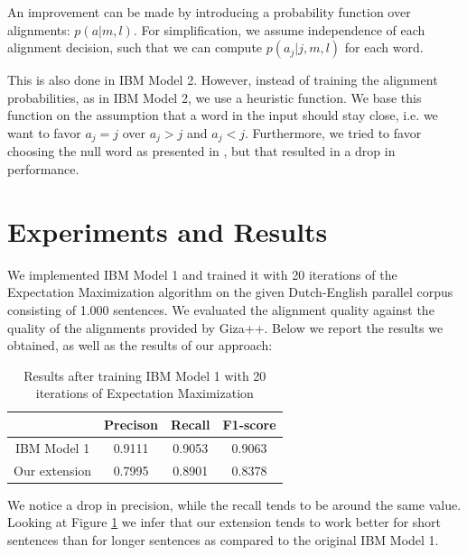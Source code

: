 \documentclass[11pt]{article}
\begin{document}
An improvement can be made by introducing a probability function over alignments: $p(a|m,l)$. 
For simplification, we assume independence of each alignment decision, such that we can compute $p(a_j|j,m,l)$ for each word.

This is also done in IBM Model 2. However,  instead of training the alignment probabilities, as in IBM Model 2, we use a heuristic function. We base this function on the assumption that a word in the input should stay close, i.e. we want to favor $a_j=j$ over $a_j>j$ and $a_j<j$. Furthermore, we tried to favor choosing the null word as presented in \cite{Moore:2004}, but that resulted in a drop in performance.

\section{Experiments and Results}
\label{Eval}
We implemented IBM Model 1 and trained it with 20 iterations of the Expectation Maximization algorithm on the given Dutch-English parallel corpus consisting of 1.000 sentences. We evaluated the alignment quality against the quality of the alignments provided by Giza++. Below we report the results we obtained, as well as the results of our approach:

\begin{table}[h]
\centering
\begin{tabular}{|c | c | c | c |}
  \hline
  & \textbf{Precison} & \textbf{Recall} & \textbf{F1-score} \\
  \hline 
  IBM Model 1 & 0.9111 & 0.9053 & 0.9063\\
  Our extension & 0.7995 & 0.8901 & 0.8378\\
  \hline
\end{tabular}
\caption{Results after training IBM Model 1 with 20 iterations of Expectation Maximization }
\label{results}
\end{table}

We notice a drop in precision, while the recall tends to be around the same value. Looking at Figure \ref{results} we infer that our extension tends to work better for short sentences than for longer sentences as compared to the original IBM Model 1.
\end{document}
